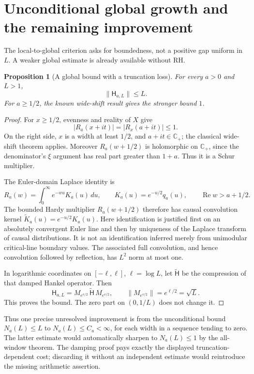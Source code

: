\documentclass[11pt,letterpaper]{article}
\newtheorem{proposition}[theorem]{Proposition}
\newcommand{\CP}{\mathbb C_+}
\newcommand{\Rea}{\operatorname{Re}}
\begin{document}
\section{Unconditional global growth and the remaining improvement}
The local-to-global criterion asks for boundedness, not a positive gap uniform in $L$. A weaker global estimate is already available without RH.
\begin{proposition}[A global bound with a truncation loss]\label{prop:globalgrowth}
For every $a>0$ and $L>1$,
\[
 \|\mathsf H_{a,L}\|\leq L.
\]
For $a\geq1/2$, the known wide-shift result gives the stronger bound $1$.
\end{proposition}
\begin{proof}
For $x\geq1/2$, evenness and reality of $X$ give
\[
 |R_a(x+it)|=|R_x(a+it)|\leq1.
\]
On the right side, $x$ is a width at least $1/2$, and $a+it\in\CP$; the classical wide-shift theorem applies. Moreover $R_a(w+1/2)$ is holomorphic on $\CP$, since the denominator's $\xi$ argument has real part greater than $1+a$. Thus it is a Schur multiplier.

The Euler-domain Laplace identity is
\[
 R_a(w)=\int_0^\infty e^{-wu}K_a(u)\,du,
 \qquad K_a(u)=e^{-u/2}q_a(u),\qquad \Rea w>a+1/2.
\]
The bounded Hardy multiplier $R_a(w+1/2)$ therefore has causal convolution kernel $\widetilde K_a(u)=e^{-u/2}K_a(u)$. Here identification is justified first on an absolutely convergent Euler line and then by uniqueness of the Laplace transform of causal distributions. It is not an identification inferred merely from unimodular critical-line boundary values. The associated full convolution, and hence convolution followed by reflection, has $L^2$ norm at most one.

In logarithmic coordinates on $[-\ell,\ell]$, $\ell=\log L$, let $\widetilde{\mathsf H}$ be the compression of that damped Hankel operator. Then
\[
 \mathsf H_{a,L}=M_{e^{v/2}}\,\widetilde{\mathsf H}\,M_{e^{v/2}},
 \qquad \|M_{e^{v/2}}\|=e^{\ell/2}=\sqrt L.
\]
This proves the bound. The zero part on $(0,1/L)$ does not change it.
\end{proof}
Thus one precise unresolved improvement is from the unconditional bound $N_a(L)\leq L$ to $N_a(L)\leq C_a<\infty$, for each width in a sequence tending to zero. The latter estimate would automatically sharpen to $N_a(L)\leq1$ by the all-window theorem. The damping proof pays exactly the displayed truncation-dependent cost; discarding it without an independent estimate would reintroduce the missing arithmetic assertion.
\end{document}

